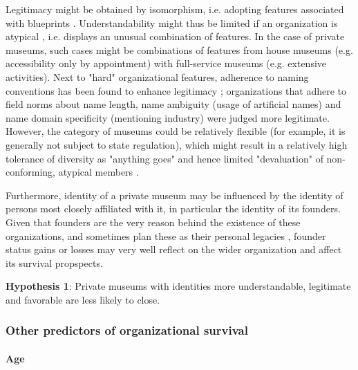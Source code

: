 \documentclass[12pt]{article}
\begin{document}
Legitimacy might be obtained by isomorphism, i.e. adopting features associated with blueprints \parencite{diMaggio_1983_iron}.
Understandability \parencite{Glynn_Abzug_2002_names} might thus be limited if an organization is atypical \parencite{Rosch_1975_family}, i.e. displays an unusual combination of features.
In the case of private museums, such cases might be combinations of features from house museums (e.g. accessibility only by appointment) with full-service museums (e.g. extensive activities). 
Next to "hard" organizational features, adherence to naming conventions has been found to enhance legitimacy \parencite{Glynn_Abzug_2002_names}; organizations that adhere to field norms about name length, name ambiguity (usage of artificial names) and name domain specificity (mentioning industry) were judged more legitimate. 
However, the category of museums could be relatively flexible (for example, it is generally not subject to state regulation), which might result in a relatively high tolerance of diversity as "anything goes" and hence limited "devaluation" of non-conforming, atypical members \parencite{Bogaert_etal_2014_ecological}.


Furthermore, identity of a private museum may be influenced by the identity of persons most closely affiliated with it, in particular the identity of its founders.
Given that founders are the very reason behind the existence of these organizations, and sometimes plan these as their personal legacies \parencite{Walker_2019_collector}, founder status gains or losses may very well reflect on the wider organization and affect its survival propspects.


\bigbreak
\noindent
\textbf{Hypothesis 1}: Private museums with identities more understandable, legitimate and favorable are less likely to close. 


\subsubsection*{Other predictors of organizational survival}


\paragraph*{Age}
\end{document}
